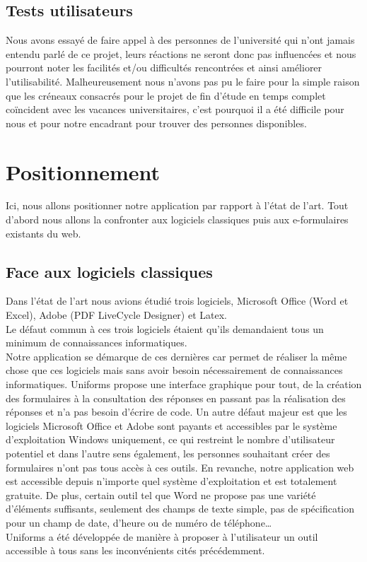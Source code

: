 \documentclass{sigplanconf}
\begin{document}
\subsection{Tests utilisateurs}
Nous avons essayé de faire appel à des personnes de l’université qui n’ont jamais entendu parlé de ce projet, leurs réactions ne seront donc pas influencées et nous pourront noter les facilités et/ou difficultés rencontrées et ainsi améliorer l’utilisabilité. Malheureusement nous n’avons pas pu le faire pour la simple raison que les créneaux consacrés pour le projet de fin d'étude en temps complet coïncident avec les vacances universitaires, c’est pourquoi il a été difficile pour nous et pour notre encadrant pour trouver des personnes disponibles.

\section{Positionnement}
Ici, nous allons positionner notre application par rapport à l’état de l’art. Tout d’abord nous allons la confronter aux logiciels classiques puis aux e-formulaires existants du web.
\subsection{Face aux logiciels classiques}
Dans l’état de l’art nous avions étudié trois logiciels,  Microsoft Office\cite{urlMicrosoft} (Word et Excel), Adobe\cite{urlAdobe} (PDF LiveCycle Designer) et Latex.\\
Le défaut commun à ces trois logiciels étaient qu’ils demandaient tous un minimum de connaissances informatiques.\\
Notre application se démarque de ces dernières car permet de réaliser la même chose que ces logiciels mais sans avoir besoin nécessairement de connaissances informatiques. Uniforms propose une interface graphique pour tout, de la création des formulaires à la consultation des réponses en passant pas la réalisation des réponses et n’a pas besoin d’écrire de code.
Un autre défaut majeur est que les logiciels Microsoft Office et Adobe sont payants et accessibles par le système d’exploitation Windows uniquement, ce qui restreint le nombre d’utilisateur potentiel et dans l’autre sens également, les personnes souhaitant créer des formulaires n’ont pas tous accès à ces outils. En revanche, notre application web est accessible depuis n’importe quel système d’exploitation et est totalement gratuite.
De plus, certain outil tel que Word ne propose pas une variété d’éléments suffisants, seulement des champs de texte simple, pas de spécification pour un champ de date, d’heure ou de numéro de téléphone…\\
Uniforms a été développée de manière à proposer à l’utilisateur un outil accessible à tous sans les inconvénients cités précédemment.
\end{document}
